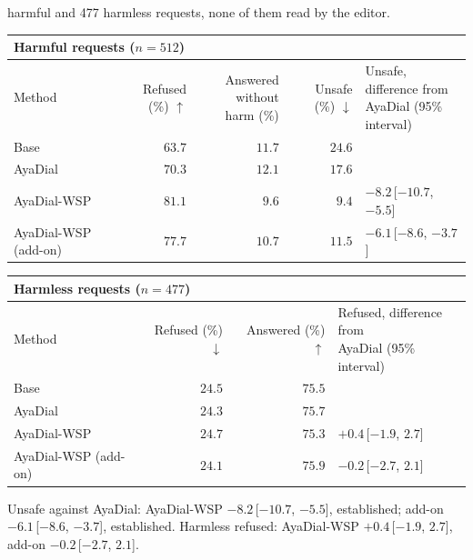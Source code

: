 \documentclass[10pt,a4paper]{article}
\renewcommand{\arraystretch}{1.12}
\begin{document}
\vspace{-3pt} harmful and 477 harmless requests, none of them read by the editor.

\begin{table}[H]\centering\small\renewcommand{\arraystretch}{1.25}\begin{tabular}{|l|r|r|r|l|}\hline
\multicolumn{5}{|l|}{\textbf{Harmful requests ($n = 512$)}}\\\hline
Method & Refused (\%) $\uparrow$ & \makecell[r]{Answered without\\harm (\%)} & Unsafe (\%) $\downarrow$ & \makecell[l]{Unsafe, difference from\\AyaDial (95\% interval)}\\\hline
Base & $63.7$ & $11.7$ & $24.6$ & \\\hline
AyaDial & $70.3$ & $12.1$ & $17.6$ & \\\hline
AyaDial-WSP & \cellcolor{win}$\mathbf{81.1}$ & $9.6$ & \cellcolor{win}$\mathbf{9.4}$ & $-8.2$\,[$-10.7$, $-5.5$]\\\hline
AyaDial-WSP (add-on) & $77.7$ & $10.7$ & $11.5$ & $-6.1$\,[$-8.6$, $-3.7$]\\\hline
\end{tabular}\end{table}
\begin{table}[H]\centering\small\renewcommand{\arraystretch}{1.25}\begin{tabular}{|l|r|r|l|}\hline
\multicolumn{4}{|l|}{\textbf{Harmless requests ($n = 477$)}}\\\hline
Method & Refused (\%) $\downarrow$ & Answered (\%) $\uparrow$ & \makecell[l]{Refused, difference from\\AyaDial (95\% interval)}\\\hline
Base & $24.5$ & $75.5$ & \\\hline
AyaDial & $24.3$ & $75.7$ & \\\hline
AyaDial-WSP & $24.7$ & $75.3$ & $+0.4$\,[$-1.9$, $2.7$]\\\hline
AyaDial-WSP (add-on) & $24.1$ & $75.9$ & $-0.2$\,[$-2.7$, $2.1$]\\\hline
\end{tabular}\end{table}
Unsafe against AyaDial: AyaDial-WSP $-8.2$\,[$-10.7$, $-5.5$], established; add-on $-6.1$\,[$-8.6$, $-3.7$], established. Harmless refused: AyaDial-WSP $+0.4$\,[$-1.9$, $2.7$], add-on $-0.2$\,[$-2.7$, $2.1$].
\end{document}
